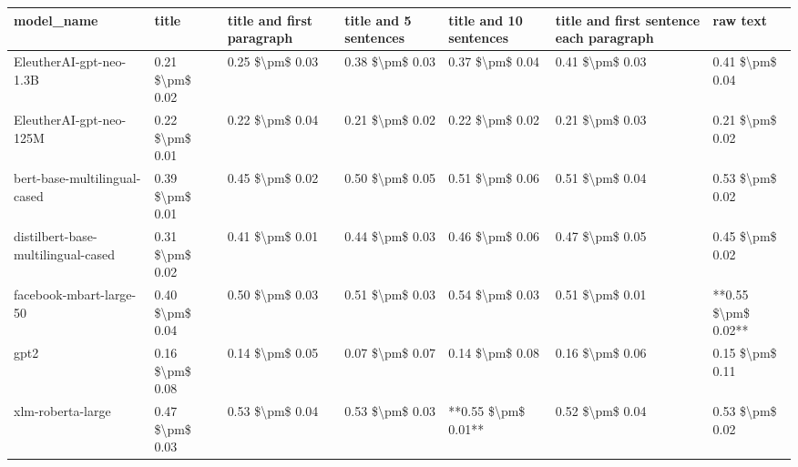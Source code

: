 \begin{tabular}{lllllll}
\toprule
                        model\_name &           title & title and first paragraph & title and 5 sentences & title and 10 sentences & title and first sentence each paragraph &            raw text \\
\midrule
           EleutherAI-gpt-neo-1.3B & 0.21 \$\textbackslash pm\$ 0.02 &           0.25 \$\textbackslash pm\$ 0.03 &       0.38 \$\textbackslash pm\$ 0.03 &        0.37 \$\textbackslash pm\$ 0.04 &                         0.41 \$\textbackslash pm\$ 0.03 &     0.41 \$\textbackslash pm\$ 0.04 \\
           EleutherAI-gpt-neo-125M & 0.22 \$\textbackslash pm\$ 0.01 &           0.22 \$\textbackslash pm\$ 0.04 &       0.21 \$\textbackslash pm\$ 0.02 &        0.22 \$\textbackslash pm\$ 0.02 &                         0.21 \$\textbackslash pm\$ 0.03 &     0.21 \$\textbackslash pm\$ 0.02 \\
      bert-base-multilingual-cased & 0.39 \$\textbackslash pm\$ 0.01 &           0.45 \$\textbackslash pm\$ 0.02 &       0.50 \$\textbackslash pm\$ 0.05 &        0.51 \$\textbackslash pm\$ 0.06 &                         0.51 \$\textbackslash pm\$ 0.04 &     0.53 \$\textbackslash pm\$ 0.02 \\
distilbert-base-multilingual-cased & 0.31 \$\textbackslash pm\$ 0.02 &           0.41 \$\textbackslash pm\$ 0.01 &       0.44 \$\textbackslash pm\$ 0.03 &        0.46 \$\textbackslash pm\$ 0.06 &                         0.47 \$\textbackslash pm\$ 0.05 &     0.45 \$\textbackslash pm\$ 0.02 \\
           facebook-mbart-large-50 & 0.40 \$\textbackslash pm\$ 0.04 &           0.50 \$\textbackslash pm\$ 0.03 &       0.51 \$\textbackslash pm\$ 0.03 &        0.54 \$\textbackslash pm\$ 0.03 &                         0.51 \$\textbackslash pm\$ 0.01 & **0.55 \$\textbackslash pm\$ 0.02** \\
                              gpt2 & 0.16 \$\textbackslash pm\$ 0.08 &           0.14 \$\textbackslash pm\$ 0.05 &       0.07 \$\textbackslash pm\$ 0.07 &        0.14 \$\textbackslash pm\$ 0.08 &                         0.16 \$\textbackslash pm\$ 0.06 &     0.15 \$\textbackslash pm\$ 0.11 \\
                 xlm-roberta-large & 0.47 \$\textbackslash pm\$ 0.03 &           0.53 \$\textbackslash pm\$ 0.04 &       0.53 \$\textbackslash pm\$ 0.03 &    **0.55 \$\textbackslash pm\$ 0.01** &                         0.52 \$\textbackslash pm\$ 0.04 &     0.53 \$\textbackslash pm\$ 0.02 \\
\bottomrule
\end{tabular}

